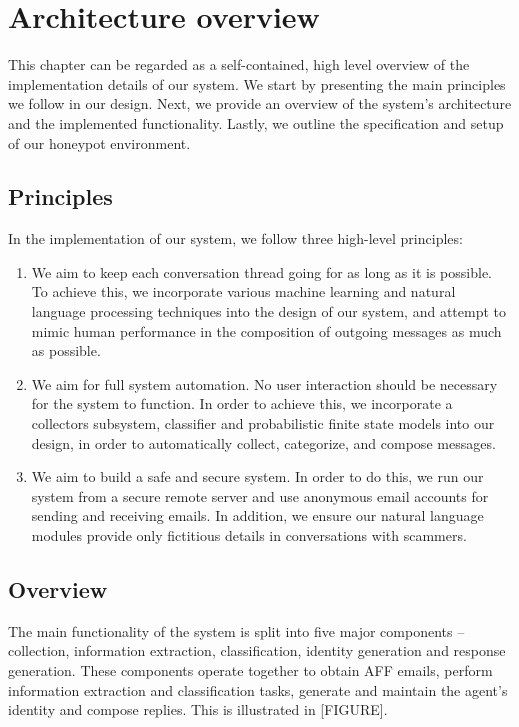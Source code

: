 \chapter{Architecture overview}
This chapter can be regarded as a self-contained, high level overview of the implementation details of our system. We start by presenting the main principles we follow in our design. Next, we provide an overview of the system's architecture and the implemented functionality. Lastly, we outline the specification and setup of our honeypot environment.

\section{Principles}
In the implementation of our system, we follow three high-level principles:

\begin{enumerate}
\item We aim to keep each conversation thread going for as long as it is possible. To achieve this, we incorporate various machine learning and natural language processing techniques into the design of our system, and attempt to mimic human performance in the composition of outgoing messages as much as possible.
\item We aim for full system automation. No user interaction should be necessary for the system to function. In order to achieve this, we incorporate a collectors subsystem, classifier and probabilistic finite state models into our design, in order to automatically collect, categorize, and compose messages.
\item We aim to build a safe and secure system. In order to do this, we run our system from a secure remote server and use anonymous email accounts for sending and receiving emails. In addition, we ensure our natural language modules provide only fictitious details in conversations with scammers.
\end{enumerate}

\section{Overview}
The main functionality of the system is split into five major components -- collection, information extraction, classification, identity generation and response generation. These components operate together to obtain AFF emails, perform information extraction and classification tasks, generate and maintain the agent's identity and compose replies. This is illustrated in [FIGURE].

